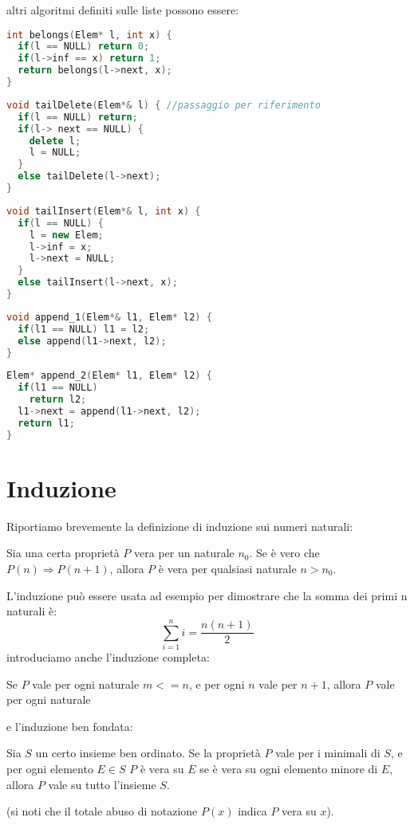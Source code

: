 \documentclass[a4paper,12pt]{article}
\begin{document}
altri algoritmi definiti sulle liste possono essere:
\begin{lstlisting}[language=C++]
int belongs(Elem* l, int x) {
  if(l == NULL) return 0;
  if(l->inf == x) return 1;
  return belongs(l->next, x);
}
\end{lstlisting}

\begin{lstlisting}[language=C++]
void tailDelete(Elem*& l) { //passaggio per riferimento
  if(l == NULL) return;
  if(l-> next == NULL) {
    delete l;
    l = NULL;
  }
  else tailDelete(l->next);
}
\end{lstlisting}

\begin{lstlisting}[language=C++]
void tailInsert(Elem*& l, int x) {
  if(l == NULL) {
    l = new Elem;
    l->inf = x;
    l->next = NULL;
  }
  else tailInsert(l->next, x);
}
\end{lstlisting}

\begin{lstlisting}[language=C++]
void append_1(Elem*& l1, Elem* l2) {
  if(l1 == NULL) l1 = l2;
  else append(l1->next, l2);
}
\end{lstlisting}

\begin{lstlisting}[language=C++]
Elem* append_2(Elem* l1, Elem* l2) {
  if(l1 == NULL)
    return l2;
  l1->next = append(l1->next, l2);
  return l1;
}
\end{lstlisting}

\section{Induzione}
Riportiamo brevemente la definizione di induzione sui numeri naturali:
\begin{center}
Sia una certa proprietà $P$ vera per un naturale $n_0$. Se è vero che $P(n) \Rightarrow P(n + 1)$, allora $P$ 
è vera per qualsiasi naturale $n > n_0$.
\end{center}

L'induzione può essere usata ad esempio per dimostrare che la somma dei primi n naturali è:
$$ \sum_{i = 1}^{n} i = \frac{n(n+1)}{2} $$  
introduciamo anche l'induzione completa:
\begin{center}
Se $P$ vale per ogni naturale $m <= n$, e per ogni $n$ vale per $n+1$, allora $P$ vale per ogni naturale
\end{center}
e l'induzione ben fondata:
\begin{center}
Sia $S$ un certo insieme ben ordinato. Se la proprietà $P$ vale per i minimali di $S$, e per ogni elemento $E \in S$
$P$ è vera su $E$ se è vera su ogni elemento minore di $E$, allora $P$ vale su tutto l'insieme $S$.

\footnotesize
(si noti che il totale abuso di notazione $P(x)$ indica $P$ vera su $x$).
\normalsize

\end{center}
\end{document}
